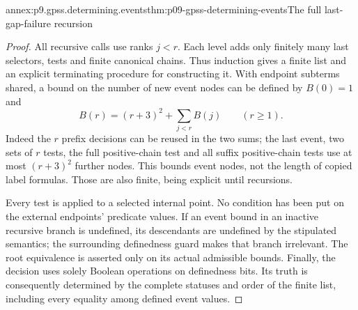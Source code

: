 \begin{annexitem}{annex:p9.gpss.determining.events}{thm:p09-gpss-determining-events}{The full last-gap-failure recursion}
\begin{proof}
All recursive calls use ranks
\(j<r\). Each level adds only
finitely many last selectors, tests
and finite canonical chains. Thus
induction gives a finite list and
an explicit terminating procedure
for constructing it. With endpoint
subterms shared, a bound on the
number of new event nodes can be
defined by \(B(0)=1\) and
\[
                  B(r)=(r+3)^2+\sum_{j<r}B(j)
                  \qquad(r\geq1).
\]
Indeed the \(r\) prefix decisions
can be reused in the two sums;
the last event, two sets of \(r\)
tests, the full positive-chain test
and all suffix positive-chain tests
use at most \((r+3)^2\) further
nodes. This bounds event nodes,
not the length of copied label
formulas. Those are also finite,
being explicit until recursions.

Every test is applied to a selected
internal point. No condition has
been put on the external endpoints'
predicate values. If an event bound
in an inactive recursive branch
is undefined, its descendants are
undefined by the stipulated semantics;
the surrounding definedness guard
makes that branch irrelevant. The
root equivalence is asserted only
on its actual admissible bounds.
Finally, the decision uses solely
Boolean operations on definedness
bits. Its truth is consequently
determined by the complete statuses
and order of the finite list,
including every equality among
defined event values.
\end{proof}
\end{annexitem}


